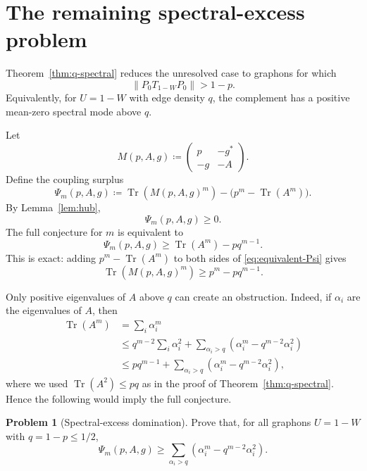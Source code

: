 \documentclass[11pt]{article}
\theoremstyle{definition}
\newtheorem{problem}[theorem]{Problem}
\theoremstyle{remark}
\newcommand{\Tr}{\operatorname{Tr}}
\newcommand{\defeq}{\coloneqq}
\begin{document}
\section{The remaining spectral-excess problem}

Theorem~\ref{thm:q-spectral} reduces the unresolved case to graphons for which
\[
  \|P_0T_{1-W}P_0\|>1-p.
\]
Equivalently, for $U=1-W$ with edge density $q$, the complement has a positive mean-zero spectral mode above $q$.

Let
\[
  M(p,A,g)
  \defeq
  \begin{pmatrix}
    p & -g^*\\
    -g & -A
  \end{pmatrix}.
\]
Define the coupling surplus
\begin{equation}\label{eq:def-Psi}
  \Psi_m(p,A,g)
  \defeq
  \Tr(M(p,A,g)^m)-\bigl(p^m-\Tr(A^m)\bigr).
\end{equation}
By Lemma~\ref{lem:hub},
\[
  \Psi_m(p,A,g)\ge0.
\]
The full conjecture for $m$ is equivalent to
\begin{equation}\label{eq:equivalent-Psi}
  \Psi_m(p,A,g)
  \ge
  \Tr(A^m)-pq^{m-1}.
\end{equation}
This is exact: adding $p^m-\Tr(A^m)$ to both sides of \eqref{eq:equivalent-Psi} gives
\[
  \Tr(M(p,A,g)^m)
  \ge p^m-pq^{m-1}.
\]

Only positive eigenvalues of $A$ above $q$ can create an obstruction.  Indeed, if $\alpha_i$ are the eigenvalues of $A$, then
\begin{align*}
  \Tr(A^m)
  &=\sum_i\alpha_i^m \\
  &\le
  q^{m-2}\sum_i\alpha_i^2
  +
  \sum_{\alpha_i>q}
  \left(\alpha_i^m-q^{m-2}\alpha_i^2\right) \\
  &\le
  pq^{m-1}
  +
  \sum_{\alpha_i>q}
  \left(\alpha_i^m-q^{m-2}\alpha_i^2\right),
\end{align*}
where we used $\Tr(A^2)\le pq$ as in the proof of Theorem~\ref{thm:q-spectral}.  Hence the following would imply the full conjecture.

\begin{problem}[Spectral-excess domination]\label{prob:spectral-excess}
Prove that, for all graphons $U=1-W$ with $q=1-p\le1/2$,
\begin{equation}\label{eq:spectral-excess-target}
  \Psi_m(p,A,g)
  \ge
  \sum_{\alpha_i>q}
  \left(\alpha_i^m-q^{m-2}\alpha_i^2\right).
\end{equation}
\end{problem}
\end{document}

